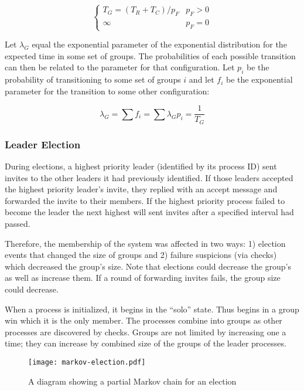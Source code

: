\begin{equation}
\begin{cases}
T_{G} = ( T_{R}+T_{C}  ) / p_{F} & p_{F} > 0 \\
\infty & p_{F} = 0
\end{cases}
\end{equation}

Let $\lambda_{G}$ equal the exponential parameter of the exponential distribution for the expected time in some set of groups.
The probabilities of each possible transition can then be related to the parameter for that configuration.
Let $p_{i}$ be the probability of transitioning to some set of groups $i$ and let $f_{i}$ be the exponential parameter for the transition to some other configuration:

\begin{equation}
\lambda_{G} = \sum f_{i} = \sum \lambda_{G} p_{i} = \frac{1}{T_{G}}
\end{equation}

\subsubsection{Leader Election}

During elections, a highest priority leader (identified by its process ID) sent invites to the other leaders it had previously identified.
If those leaders accepted the highest priority leader's invite, they replied with an accept message and forwarded the invite to their members.
If the highest priority process failed to become the leader the next highest will sent invites after a specified interval had passed.

Therefore, the membership of the system was affected in two ways: 1) election events that changed the size of groups and 2) failure suspicions (via checks) which decreased the group's size.
Note that elections could decrease the group's as well as increase them.
If a round of forwarding invites fails, the group size could decrease.

When a process is initialized, it begins in the ``solo'' state.
Thus begins in a group win which it is the only member. 
The processes combine into groups as other processes are discovered by checks.
Groups are not limited by increasing one a time; they can increase by combined size of the groups of the leader processes.

\begin{figure}[!h]
\centering
\texttt{[image: markov-election.pdf]}
\caption{A diagram showing a partial Markov chain for an election}
\label{fig:MARKOVELECTION}
\end{figure}


